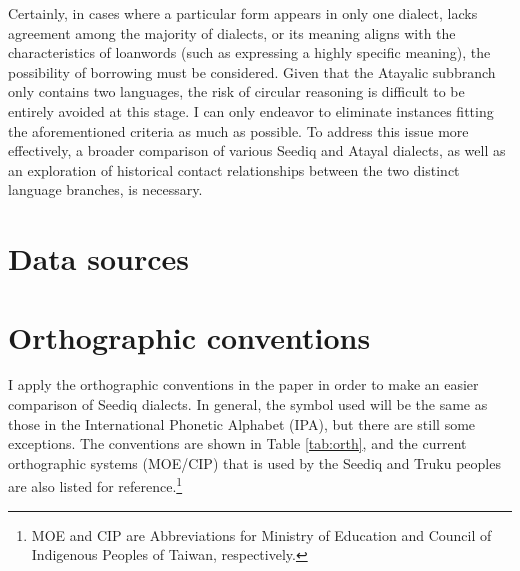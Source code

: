 Certainly, in cases where a particular form appears in only one dialect, lacks agreement among the majority of dialects, or its meaning aligns with the characteristics of loanwords (such as expressing a highly specific meaning), the possibility of borrowing must be considered. Given that the Atayalic subbranch only contains two languages, the risk of circular reasoning is difficult to be entirely avoided at this stage. I can only endeavor to eliminate instances fitting the aforementioned criteria as much as possible. To address this issue more effectively, a broader comparison of various Seediq and Atayal dialects, as well as an exploration of historical contact relationships between the two distinct language branches, is necessary.


\section{Data sources}
\lipsum[1-3]

\section{Orthographic conventions}

I apply the orthographic conventions in the paper in order to make an easier comparison of Seediq dialects. In general, the symbol used will be the same as those in the International Phonetic Alphabet (IPA), but there are still some exceptions. The conventions are shown in Table \ref{tab:orth}, and the current orthographic systems (MOE/CIP) that is used by the Seediq and Truku peoples are also listed for reference.\footnote{MOE and CIP are Abbreviations for Ministry of Education and Council of Indigenous Peoples of Taiwan, respectively.} 

